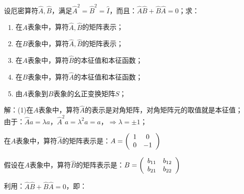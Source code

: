 设厄密算符$\widehat A,\widehat B$，满足$\widehat A^2  = \widehat B^2  = \widehat I$，而且：$\widehat A\widehat B + \widehat B\widehat A = 0$；求：

\begin{enumerate}
    \item 在$A$表象中，算符$\widehat A,\widehat B$的矩阵表示；
    \item 在$B$表象中，算符$\widehat A,\widehat B$的矩阵表示；
    \item 在$A$表象中，算符$\hat B$的本征值和本征函数；
    \item 在$B$表象中，算符$\hat A$的本征值和本征函数；
    \item 由$A$表象到$B$表象的幺正变换矩阵$S$；
   \end{enumerate}

解：(1)在$A$表象中，算符$\hat A$的表示是对角矩阵，对角矩阵元的取值就是本征值；
由于：$\widehat A a = \lambda a$，$\widehat A^2 a = \lambda ^2 a = a$，$ \Rightarrow \lambda  =  \pm 1$；

在$A$表象中，算符$\hat A$的矩阵表示是：$A = \left( {\begin{array}{*{20}c}
   1 & 0  \\
   0 & { - 1}  \\
\end{array}} \right)$

假设在$A$表象中，算符$\hat B$的矩阵表示是：$B = \left( {\begin{array}{*{20}c}
   {b_{11} } & {b_{12} }  \\
   {b_{21} } & {b_{22} }  \\
\end{array}} \right)$

利用：$\widehat A\widehat B + \widehat B\widehat A = 0$，即：


